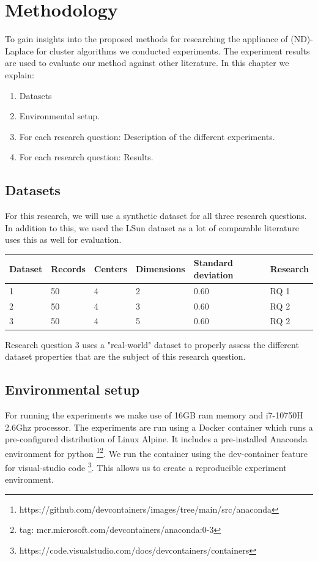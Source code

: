 \chapter{Methodology}

To gain insights into the proposed methods for researching the appliance of (ND)-Laplace for cluster algorithms we conducted experiments.
The experiment results are used to evaluate our method against other literature.
In this chapter we explain:
\begin{enumerate}

  \item Datasets
  \item Environmental setup.
  \item For each research question: Description of the different experiments.
  \item For each research question: Results.
\end{enumerate}

\section{Datasets}
For this research, we will use a synthetic dataset for all three research questions.
In addition to this, we used the LSun dataset as a lot of comparable literature uses this as well for evaluation.
\begin{table}[h]
  \begin{tabular}{@{}llllll@{}}
    \toprule
    Dataset & Records & Centers & Dimensions & Standard deviation & Research \\ \midrule
    1       & 50      & 4       & 2          & 0.60               & RQ 1     \\ \bottomrule
    2       & 50      & 4       & 3          & 0.60               & RQ 2     \\ \bottomrule
    3       & 50      & 4       & 5          & 0.60               & RQ 2     \\ \bottomrule
  \end{tabular}
\end{table}

Research question 3 uses a "real-world" dataset to properly assess the different dataset properties that are the subject of this research question.
\section{Environmental setup}
For running the experiments we make use of 16GB ram memory and i7-10750H 2.6Ghz processor.
The experiments are run using a Docker container which runs a pre-configured distribution of Linux Alpine.
It includes a pre-installed Anaconda environment for python \footnote{https://github.com/devcontainers/images/tree/main/src/anaconda}\footnote{tag: mcr.microsoft.com/devcontainers/anaconda:0-3}.
We run the container using the dev-container feature for visual-studio code \footnote{https://code.visualstudio.com/docs/devcontainers/containers}.
This allows us to create a reproducible experiment environment.
\newpage
